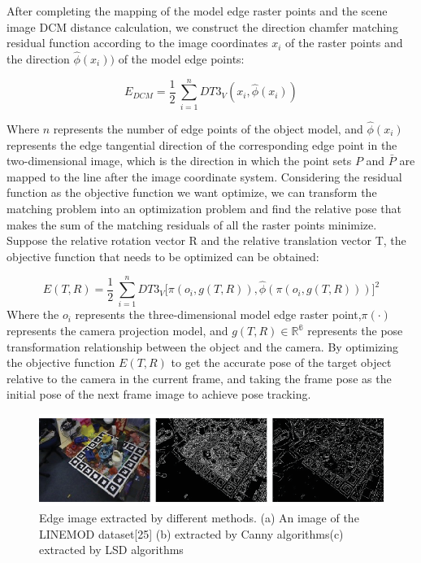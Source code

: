 \documentclass{cta-author}
\begin{document}
After completing the mapping of the model edge raster points and the scene image DCM distance calculation, we construct the direction chamfer matching residual function according to the image coordinates $x_{i}$ of 
the raster points and the direction $\hat{\phi}(x_{i}))$ of the model edge points:

\begin{equation}\label{eq8}
  E_{DCM}={\frac{1}{2}\ \sum_{i=1}^{n}DT3_{V}(x_{i},\hat{\phi}(x_{i}))}
\end{equation}

Where $n$ represents the number of edge points of the object model, and $\hat{\phi}(x_i)$  represents the edge tangential direction of the corresponding edge point in the two-dimensional image, which is the direction in which the point sets $P$ and $\bar{P}$  are mapped to the line after the image coordinate system. Considering the residual function as the objective function we want optimize, we can transform the matching problem into an optimization problem and find the relative pose that makes the sum of the matching residuals of all the raster points minimize. Suppose the relative rotation vector R and the relative translation vector T, the objective function that needs to be optimized can be obtained:

\begin{equation}\label{eq9}
  E(T,R)={\frac{1}{2}\ \sum_{i=1}^{n}DT3_{V}[\pi(o_{i},g(T,R)),\hat{\phi}(\pi(o_{i},g(T,R)))}]^{2}
\end{equation}
Where the $o_{i}$ represents the three-dimensional model edge raster point,$\pi(\cdot)$ represents the 
camera projection model, and $g(T,R)\in \mathbb{R^{6}}$ represents the pose transformation relationship between the object and the camera. By optimizing the objective function $E(T,R)$ to get the accurate pose 
of the target object relative to the camera in the current frame, and  taking the frame pose as the initial pose of the next frame image to achieve pose tracking.


\begin{figure}[!h]
  \centering
  \includegraphics{fig3.eps}
  \caption{ Edge image extracted by different methods. (a) An image of the LINEMOD dataset[25] (b) extracted by Canny algorithms(c) extracted by LSD algorithms}
  \label{3}
  \end{figure}
\end{document}
